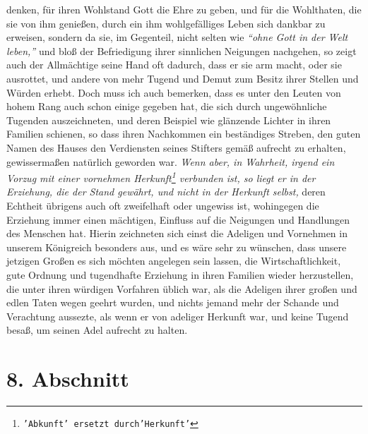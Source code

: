 denken, für ihren Wohlstand Gott die Ehre zu geben, und für die Wohlthaten, die
sie von ihm genießen, durch ein ihm wohlgefälliges Leben sich dankbar zu
erweisen, sondern da sie, im Gegenteil, nicht selten wie
\textit{"`ohne Gott in der
Welt leben,"'}  und bloß der Befriedigung ihrer sinnlichen Neigungen nachgehen,
so zeigt auch der Allmächtige seine Hand oft dadurch, dass
er sie arm macht, oder
sie ausrottet, und andere von mehr Tugend und Demut zum
Besitz ihrer Stellen
und Würden erhebt. Doch muss ich auch bemerken, dass es unter den Leuten von
hohem
Rang auch schon einige gegeben hat, die sich durch ungewöhnliche Tugenden
auszeichneten, und deren Beispiel wie glänzende Lichter in ihren Familien
schienen, so dass ihren Nachkommen ein beständiges Streben, den guten Namen des
Hauses den Verdiensten seines Stifters gemäß aufrecht zu erhalten, gewissermaßen
natürlich geworden war. \textit{Wenn aber, in Wahrheit, irgend ein Vorzug mit
einer
vornehmen Herkunft\footnote{\texttt{'Abkunft' ersetzt durch'Herkunft'}}
verbunden ist, so liegt er in der Erziehung,
die der Stand
gewährt, und nicht in der Herkunft selbst,} deren Echtheit übrigens auch oft
zweifelhaft oder ungewiss ist, wohingegen die Erziehung immer einen mächtigen,
Einfluss auf die Neigungen und Handlungen des Menschen hat. Hierin zeichneten
sich einst die Adeligen und Vornehmen in unserem Königreich besonders aus,
und es wäre sehr zu wünschen, dass unsere jetzigen Großen es sich möchten
angelegen sein lassen, die Wirtschaftlichkeit, gute Ordnung und tugendhafte
Erziehung in ihren Familien wieder herzustellen, die unter ihren würdigen
Vorfahren üblich war, als die Adeligen ihrer großen und edlen Taten wegen
geehrt wurden, und nichts jemand mehr der Schande und Verachtung aussezte, als
wenn er von adeliger Herkunft war, und keine Tugend besaß, um seinen Adel
aufrecht zu halten.

\section{8. Abschnitt} \label{kap11_ab8}

